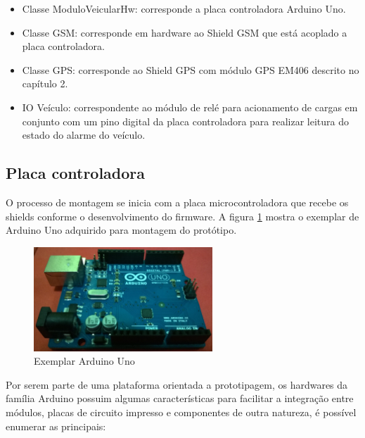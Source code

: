 \begin{itemize}
	\item Classe ModuloVeicularHw: corresponde a placa controladora Arduino Uno.
	\item Classe GSM: corresponde em hardware ao Shield GSM que está acoplado a placa controladora.
	\item Classe GPS: corresponde ao Shield GPS com módulo GPS EM406 descrito no capítulo 2.
	\item IO Veículo: correspondente ao módulo de relé para acionamento de cargas em conjunto com um pino digital da placa controladora para realizar leitura do estado do alarme do veículo.
\end{itemize}

\subsection{Placa controladora}

O processo de montagem se inicia com a placa microcontroladora que recebe os shields conforme o desenvolvimento do firmware. A figura \ref{fig:arduinounoimpl} mostra o exemplar de Arduino Uno adquirido para montagem do protótipo.

\begin{figure}[!htb]
	\centering
	\includegraphics[width=0.6\textwidth]{figures/arduinoUnoReal.jpg}
	\caption{Exemplar Arduino Uno}
	\label{fig:arduinounoimpl}
\end{figure}

Por serem parte de uma plataforma orientada a prototipagem, os hardwares da família Arduino possuim algumas características para facilitar a integração entre módulos, placas de circuito impresso e componentes de outra natureza, é possível enumerar as principais:

